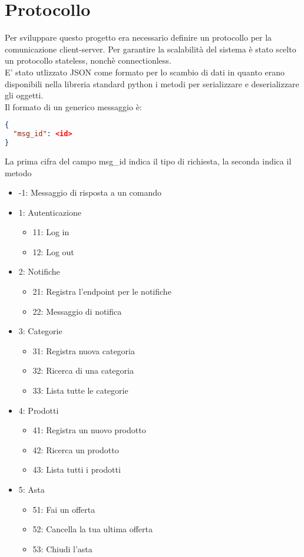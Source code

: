 \section{Protocollo}
Per sviluppare questo progetto era necessario definire un protocollo per la comunicazione client-server.
Per garantire  la scalabilità del sistema è stato scelto un protocollo stateless, nonchè connectionless.\\
E' stato utlizzato JSON come formato per lo scambio di dati in quanto erano disponibili nella libreria standard python i metodi per serializzare e deserializzare gli oggetti.\\

Il formato di un generico  messaggio è:
\begin{lstlisting}[language=json]
{
  "msg_id": <id>
}
\end{lstlisting}
La prima cifra del campo msg\_id indica il tipo di richiesta, la seconda indica il metodo
\begin{itemize}
\item -1: Messaggio di risposta a un comando
\item 1: Autenticazione
\begin{itemize}
\item 11: Log in
\item 12: Log out
\end{itemize}
\item 2: Notifiche
\begin{itemize}
\item 21: Registra l'endpoint per le notifiche
\item 22: Messaggio di notifica
\end{itemize}
\item 3: Categorie
\begin{itemize}
\item 31: Registra nuova categoria
\item 32: Ricerca di una categoria
\item 33: Lista tutte le categorie
\end{itemize}
\item 4: Prodotti
\begin{itemize}
\item 41: Registra un nuovo prodotto
\item 42: Ricerca un prodotto
\item 43: Lista tutti i prodotti
\end{itemize}
\item 5: Asta
\begin{itemize}
\item 51: Fai un offerta
\item 52: Cancella la tua ultima offerta
\item 53: Chiudi l'asta

\end{itemize}

\end{itemize}

